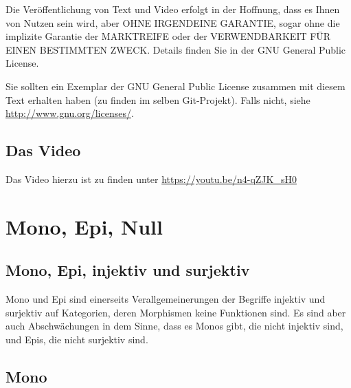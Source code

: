 \documentclass[a4paper]{amsart}
\theoremstyle{definition}
\begin{document}
Die Veröffentlichung von Text und Video erfolgt in der Hoffnung, dass es Ihnen von Nutzen sein wird, 
aber OHNE IRGENDEINE GARANTIE, sogar ohne die implizite Garantie der MARKTREIFE oder der 
VERWENDBARKEIT FÜR EINEN BESTIMMTEN ZWECK. Details finden Sie in der GNU General Public License.

Sie sollten ein Exemplar der GNU General Public License zusammen mit diesem Text erhalten haben 
(zu finden im selben Git-Projekt). 
Falls nicht, siehe \url{http://www.gnu.org/licenses/}.

\subsection*{Das Video}
Das Video hierzu ist zu finden unter 
{\tiny
   \url{https://youtu.be/n4-qZJK_sH0}
}

\section{Mono, Epi, Null}

\subsection{Mono, Epi, injektiv und surjektiv}
Mono und Epi sind einerseits Verallgemeinerungen der Begriffe injektiv und surjektiv auf Kategorien, deren Morphismen keine Funktionen sind. Es sind aber auch Abschwächungen in dem Sinne, dass es Monos gibt, die nicht injektiv sind, und Epis, die nicht surjektiv sind.

\subsection{Mono}
\end{document}
